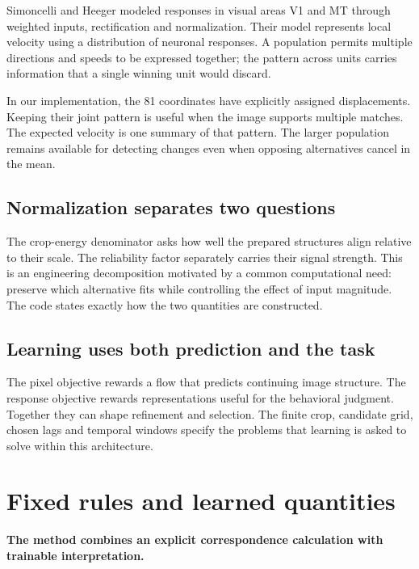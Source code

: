 \documentclass[11pt,letterpaper]{article}
\begin{document}
Simoncelli and Heeger modeled responses in visual areas V1 and MT through weighted inputs, rectification and normalization. Their model represents local velocity using a distribution of neuronal responses. A population permits multiple directions and speeds to be expressed together; the pattern across units carries information that a single winning unit would discard.


In our implementation, the 81 coordinates have explicitly assigned displacements. Keeping their joint pattern is useful when the image supports multiple matches. The expected velocity is one summary of that pattern. The larger population remains available for detecting changes even when opposing alternatives cancel in the mean.


\subsection*{Normalization separates two questions}

The crop-energy denominator asks how well the prepared structures align relative to their scale. The reliability factor separately carries their signal strength. This is an engineering decomposition motivated by a common computational need: preserve which alternative fits while controlling the effect of input magnitude. The code states exactly how the two quantities are constructed.


\subsection*{Learning uses both prediction and the task}

The pixel objective rewards a flow that predicts continuing image structure. The response objective rewards representations useful for the behavioral judgment. Together they can shape refinement and selection. The finite crop, candidate grid, chosen lags and temporal windows specify the problems that learning is asked to solve within this architecture.


\clearpage

\section{Fixed rules and learned quantities}\label{sec17}

\textbf{The method combines an explicit correspondence calculation with trainable interpretation.}
\end{document}
